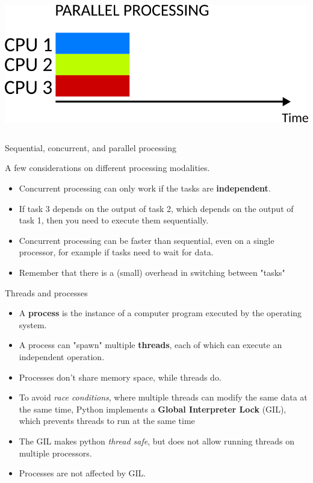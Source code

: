 \documentclass[9pt, aspectratio=169]{beamer}
\begin{document}
\begin{frame}
\begin{columns}
\begin{column}{.6\textwidth}
			\pause
			\includegraphics[width=.65\textwidth]{parallel.png}
		\end{column}
	\end{columns}
\end{frame}

\begin{frame}
	{Sequential, concurrent, and parallel processing}

	A few considerations on different processing modalities.

	\begin{itemize}
		\item Concurrent processing can only work if the tasks are \textbf{independent}.
		\item If task 3 depends on the output of task 2, which depends on the output of task 1, then you need to execute them sequentially.
		\item Concurrent processing can be faster than sequential, even on a single processor, for example if tasks need to wait for data.
		\item Remember that there is a (small) overhead in switching between "tasks"
	\end{itemize}
\end{frame}

\begin{frame}
	{Threads and processes}
	\begin{itemize}
		\item A \textbf{process} is the instance of a computer program executed by the operating system.
		\item A process can "spawn" multiple \textbf{threads}, each of which can execute an independent operation.
		\item Processes don't share memory space, while threads do.
		      \pause
		\item To avoid \textit{race conditions}, where multiple threads can modify the same data at the same time, Python implements a \textbf{Global Interpreter Lock} (GIL), which prevents threads to run at the same time
		\item The GIL makes python \textit{thread safe}, but does not allow running threads on multiple processors.
		      \pause
		\item Processes are not affected by GIL.
	\end{itemize}
\end{frame}
\end{document}

